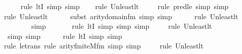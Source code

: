 \begin{isabellebody}
\ \ \ \ \isamarkupfalse%
{\isacharparenleft}{\kern0pt}rule\ ltI{\isacharcomma}{\kern0pt}\ simp{\isacharcomma}{\kern0pt}\ simp{\isacharparenright}{\kern0pt}\isanewline
\ \ \ \isamarkupfalse%
{\isacharparenleft}{\kern0pt}rule\ Un{\isacharunderscore}{\kern0pt}least{\isacharunderscore}{\kern0pt}lt{\isacharparenright}{\kern0pt}\isanewline
\ \ \ \ \isamarkupfalse%
{\isacharparenleft}{\kern0pt}rule\ pred{\isacharunderscore}{\kern0pt}le{\isacharcomma}{\kern0pt}\ simp{\isacharcomma}{\kern0pt}\ simp{\isacharparenright}{\kern0pt}{\isacharplus}{\kern0pt}\isanewline
\ \ \ \ \isamarkupfalse%
{\isacharparenleft}{\kern0pt}rule\ Un{\isacharunderscore}{\kern0pt}least{\isacharunderscore}{\kern0pt}lt{\isacharparenright}{\kern0pt}\isanewline
\ \ \ \ \ \isamarkupfalse%
{\isacharparenleft}{\kern0pt}subst\ arity{\isacharunderscore}{\kern0pt}domain{\isacharunderscore}{\kern0pt}fm{\isacharcomma}{\kern0pt}\ simp{\isacharcomma}{\kern0pt}\ simp{\isacharparenright}{\kern0pt}\isanewline
\ \ \ \ \ \isamarkupfalse%
{\isacharparenleft}{\kern0pt}rule\ Un{\isacharunderscore}{\kern0pt}least{\isacharunderscore}{\kern0pt}lt{\isacharparenright}{\kern0pt}\isanewline
\ \ \ \ \ \ \isamarkupfalse%
\ simp\isanewline
\ \ \ \ \ \ \isamarkupfalse%
{\isacharparenleft}{\kern0pt}rule\ ltI{\isacharcomma}{\kern0pt}\ simp{\isacharcomma}{\kern0pt}\ simp{\isacharcomma}{\kern0pt}\ simp{\isacharparenright}{\kern0pt}\isanewline
\ \ \ \ \isamarkupfalse%
{\isacharparenleft}{\kern0pt}rule\ Un{\isacharunderscore}{\kern0pt}least{\isacharunderscore}{\kern0pt}lt{\isacharparenright}{\kern0pt}{\isacharplus}{\kern0pt}\isanewline
\ \ \ \ \ \ \isamarkupfalse%
\ {\isacharparenleft}{\kern0pt}simp{\isacharcomma}{\kern0pt}\ simp{\isacharparenright}{\kern0pt}\isanewline
\ \ \ \ \ \isamarkupfalse%
{\isacharparenleft}{\kern0pt}rule\ ltI{\isacharcomma}{\kern0pt}\ simp{\isacharcomma}{\kern0pt}\ simp{\isacharparenright}{\kern0pt}\isanewline
\ \ \ \ \isamarkupfalse%
{\isacharparenleft}{\kern0pt}rule\ le{\isacharunderscore}{\kern0pt}trans{\isacharcomma}{\kern0pt}\ rule\ arity{\isacharunderscore}{\kern0pt}finite{\isacharunderscore}{\kern0pt}M{\isacharunderscore}{\kern0pt}fm{\isacharcomma}{\kern0pt}\ simp{\isacharcomma}{\kern0pt}\ simp{\isacharparenright}{\kern0pt}\isanewline
\ \ \ \ \isamarkupfalse%
{\isacharparenleft}{\kern0pt}rule\ Un{\isacharunderscore}{\kern0pt}least{\isacharunderscore}{\kern0pt}lt{\isacharparenright}{\kern0pt}{\isacharplus}{\kern0pt}\isanewline

\end{isabellebody}
